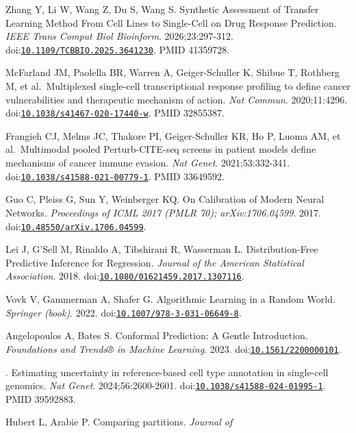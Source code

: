 \documentclass[11pt]{article}
\begin{document}
\begin{enumerate}[label={[\arabic*]},leftmargin=2.6em,labelsep=0.5em,itemsep=1.5pt]
  Zhang Y, Li W, Wang Z, Du S, Wang S. Synthetic Assessment of Transfer
  Learning Method From Cell Lines to Single-Cell on Drug Response
  Prediction. \emph{IEEE Trans Comput Biol Bioinform}. 2026;23:297-312.
  doi:\href{https://doi.org/10.1109/TCBBIO.2025.3641230}{\nolinkurl{10.1109/TCBBIO.2025.3641230}}.
  PMID 41359728.
\item
  McFarland JM, Paolella BR, Warren A, Geiger-Schuller K, Shibue T,
  Rothberg M, et al.~Multiplexed single-cell transcriptional response
  profiling to define cancer vulnerabilities and therapeutic mechanism
  of action. \emph{Nat Commun}. 2020;11:4296.
  doi:\href{https://doi.org/10.1038/s41467-020-17440-w}{\nolinkurl{10.1038/s41467-020-17440-w}}.
  PMID 32855387.
\item
  Frangieh CJ, Melms JC, Thakore PI, Geiger-Schuller KR, Ho P, Luoma AM,
  et al.~Multimodal pooled Perturb-CITE-seq screens in patient models
  define mechanisms of cancer immune evasion. \emph{Nat Genet}.
  2021;53:332-341.
  doi:\href{https://doi.org/10.1038/s41588-021-00779-1}{\nolinkurl{10.1038/s41588-021-00779-1}}.
  PMID 33649592.
\item
  Guo C, Pleiss G, Sun Y, Weinberger KQ. On Calibration of Modern Neural
  Networks. \emph{Proceedings of ICML 2017 (PMLR 70); arXiv:1706.04599}.
  2017.
  doi:\href{https://doi.org/10.48550/arXiv.1706.04599}{\nolinkurl{10.48550/arXiv.1706.04599}}.
\item
  Lei J, G'Sell M, Rinaldo A, Tibshirani R, Wasserman L.
  Distribution-Free Predictive Inference for Regression. \emph{Journal
  of the American Statistical Association}. 2018.
  doi:\href{https://doi.org/10.1080/01621459.2017.1307116}{\nolinkurl{10.1080/01621459.2017.1307116}}.
\item
  Vovk V, Gammerman A, Shafer G. Algorithmic Learning in a Random World.
  \emph{Springer (book)}. 2022.
  doi:\href{https://doi.org/10.1007/978-3-031-06649-8}{\nolinkurl{10.1007/978-3-031-06649-8}}.
\item
  Angelopoulos A, Bates S. Conformal Prediction: A Gentle Introduction.
  \emph{Foundations and Trends® in Machine Learning}. 2023.
  doi:\href{https://doi.org/10.1561/2200000101}{\nolinkurl{10.1561/2200000101}}.
\item
  . Estimating uncertainty in reference-based cell type annotation in
  single-cell genomics. \emph{Nat Genet}. 2024;56:2600-2601.
  doi:\href{https://doi.org/10.1038/s41588-024-01995-1}{\nolinkurl{10.1038/s41588-024-01995-1}}.
  PMID 39592883.
\item
  Hubert L, Arabie P. Comparing partitions. \emph{Journal of
}
\end{enumerate}
\end{document}
